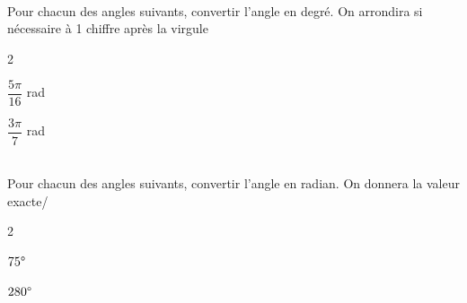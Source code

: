 \documentclass[a4paper,12pt]{article}        %
\begin{document}
\\
Pour chacun des angles suivants, convertir l'angle en degré. On arrondira si nécessaire à 1 chiffre après la virgule
\begin{multicols}{2}
\begin{enumMet}
    \item $\dfrac{5\pi}{16}$ rad
    \item $\dfrac{3\pi}{7}$ rad
\end{enumMet}
\end{multicols}

\\
Pour chacun des angles suivants, convertir l'angle en radian. On donnera la valeur exacte/
\begin{multicols}{2}
\begin{enumMet}
    \item $75\degree$
    \item $280\degree$
\end{enumMet}
\end{multicols}
\end{document}
